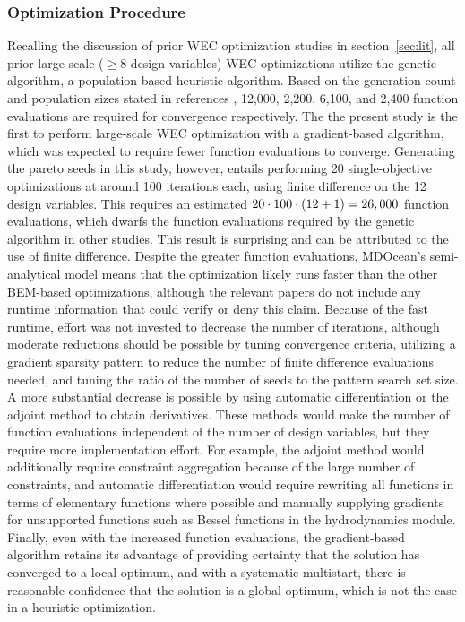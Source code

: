 \subsubsection{Optimization Procedure}
\label{sec:discussion-optimization}
Recalling the discussion of prior WEC optimization studies in section~\ref{sec:lit}, all prior large-scale ($\geq8$ design variables) WEC optimizations utilize the genetic algorithm, a population-based heuristic algorithm.
Based on the generation count and population sizes stated in references \cite{khanal_multi-objective_2024,garcia-teruel_reliability-based_2021,cotten_multi-objective_2022,abdulkadir_control_2024}, 12,000, 2,200, 6,100, and 2,400 function evaluations are required for convergence respectively.
The the present study is the first to perform large-scale WEC optimization with a gradient-based algorithm, which was expected to require fewer function evaluations to converge.
Generating the pareto seeds in this study, however, entails performing 20 single-objective optimizations at around 100 iterations each, using finite difference on the 12 design variables.
This requires an estimated $20\cdot100\cdot(12+1)=26,000$ function evaluations, which dwarfs the function evaluations required by the genetic algorithm in other studies.
This result is surprising and can be attributed to the use of finite difference.
Despite the greater function evaluations, MDOcean's semi-analytical model means that the optimization likely runs faster than the other BEM-based optimizations, although the relevant papers do not include any runtime information that could verify or deny this claim.
Because of the fast runtime, effort was not invested to decrease the number of iterations, although moderate reductions should be possible by tuning convergence criteria, utilizing a gradient sparsity pattern to reduce the number of finite difference evaluations needed, and tuning the ratio of the number of seeds to the pattern search set size.
A more substantial decrease is possible by using automatic differentiation or the adjoint method to obtain derivatives.
These methods would make the number of function evaluations independent of the number of design variables, but they require more implementation effort.
For example, the adjoint method would additionally require constraint aggregation because of the large number of constraints, and automatic differentiation would require rewriting all functions in terms of elementary functions where possible and manually supplying gradients for unsupported functions such as Bessel functions in the hydrodynamics module.
Finally, even with the increased function evaluations, the gradient-based algorithm retains its advantage of providing certainty that the solution has converged to a local optimum, and with a systematic multistart, there is reasonable confidence that the solution is a global optimum, which is not the case in a heuristic optimization.

